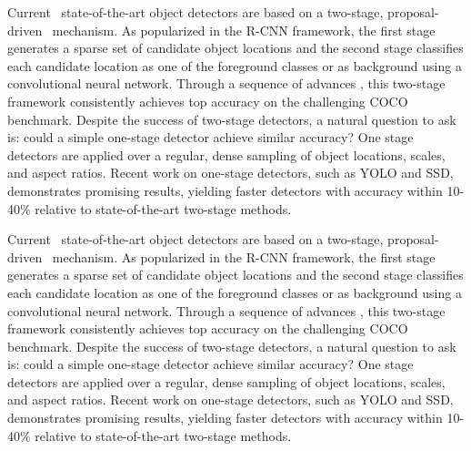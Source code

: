 Current~\cite{girshick2014rich} state-of-the-art object detectors are based on
a two-stage, proposal-driven~\cite{lin2017focal} mechanism. As popularized
in the R-CNN framework, the first stage generates a
sparse set of candidate object locations and the second stage
classifies each candidate location as one of the foreground
classes or as background using a convolutional neural network. Through a sequence of advances , this
two-stage framework consistently achieves top accuracy on
the challenging COCO benchmark.
Despite the success of two-stage detectors, a natural
question to ask is: could a simple one-stage detector achieve
similar accuracy? One stage detectors are applied over a
regular, dense sampling of object locations, scales, and aspect ratios. Recent work on one-stage detectors, such as
YOLO and SSD, demonstrates promising
results, yielding faster detectors with accuracy within 10-
40\% relative to state-of-the-art two-stage methods.

Current~\cite{girshick2014rich} state-of-the-art object detectors are based on
a two-stage, proposal-driven~\cite{lin2017focal} mechanism. As popularized
in the R-CNN framework, the first stage generates a
sparse set of candidate object locations and the second stage
classifies each candidate location as one of the foreground
classes or as background using a convolutional neural network. Through a sequence of advances , this
two-stage framework consistently achieves top accuracy on
the challenging COCO benchmark.
Despite the success of two-stage detectors, a natural
question to ask is: could a simple one-stage detector achieve
similar accuracy? One stage detectors are applied over a
regular, dense sampling of object locations, scales, and aspect ratios. Recent work on one-stage detectors, such as
YOLO and SSD, demonstrates promising
results, yielding faster detectors with accuracy within 10-
40\% relative to state-of-the-art two-stage methods.